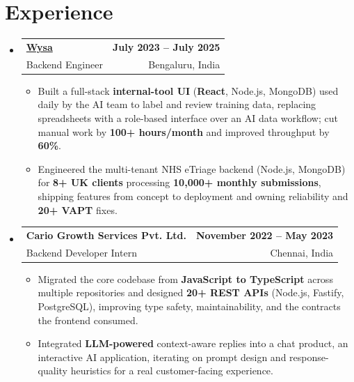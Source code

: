\documentclass[letterpaper,10pt]{article}
\makeatletter
\newcommand{\resumeItem}[1]{
  \item\small{#1\vspace{-1pt}}
}
\newcommand{\resumeSubheading}[4]{
  \vspace{1pt}\item
    \begin{tabular*}{0.985\textwidth}[t]{l@{\extracolsep{\fill}}r}
      \textbf{#1} & \textbf{\small #2} \\
      {\small\color{ResumeSlate} #3} & {\small\color{ResumeSlate} #4} \\
    \end{tabular*}\vspace{-6pt}
}
\newcommand{\resumeSubHeadingListStart}{\begin{itemize}[leftmargin=0.0in, label={}, itemsep=2pt, topsep=2pt]}
\newcommand{\resumeSubHeadingListEnd}{\end{itemize}}
\newcommand{\resumeItemListStart}{\begin{itemize}[leftmargin=0.18in, itemsep=2pt, topsep=1pt]}
\newcommand{\resumeItemListEnd}{\end{itemize}\vspace{-4pt}}
\makeatother
\begin{document}
\section{Experience}
\resumeSubHeadingListStart
  \resumeSubheading
    {\href{https://www.wysa.io}{Wysa}}{July 2023 -- July 2025}
    {Backend Engineer}{Bengaluru, India}
    \resumeItemListStart
      \resumeItem{Built a full-stack \textbf{internal-tool UI} (\textbf{React}, Node.js, MongoDB) used daily by the AI team to label and review training data, replacing spreadsheets with a role-based interface over an AI data workflow; cut manual work by \textbf{100+ hours/month} and improved throughput by \textbf{60\%}.}
      \resumeItem{Engineered the multi-tenant NHS eTriage backend (Node.js, MongoDB) for \textbf{8+ UK clients} processing \textbf{10{,}000+ monthly submissions}, shipping features from concept to deployment and owning reliability and \textbf{20+ VAPT} fixes.}
    \resumeItemListEnd
  \resumeSubheading
    {Cario Growth Services Pvt. Ltd.}{November 2022 -- May 2023}
    {Backend Developer Intern}{Chennai, India}
    \resumeItemListStart
      \resumeItem{Migrated the core codebase from \textbf{JavaScript to TypeScript} across multiple repositories and designed \textbf{20+ REST APIs} (Node.js, Fastify, PostgreSQL), improving type safety, maintainability, and the contracts the frontend consumed.}
      \resumeItem{Integrated \textbf{LLM-powered} context-aware replies into a chat product, an interactive AI application, iterating on prompt design and response-quality heuristics for a real customer-facing experience.}
    \resumeItemListEnd
\resumeSubHeadingListEnd
\vspace{-4pt}
\end{document}
